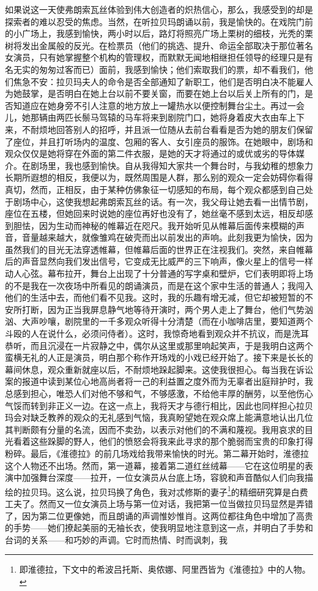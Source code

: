 \par 如果说这一天使弗朗索瓦丝体验到伟大创造者的炽热信心，那么，我感受到的却是探索者的难以忍受的焦虑。当然，在听拉贝玛朗诵以前，我是愉快的。在戏院门前的小广场上，我感到愉快，两小时以后，路灯将照亮广场上栗树的细枝，光秃的栗树将发出金属般的反光。在检票员（他们的挑选、提升、命运全部取决于那位著名女演员，只有她掌握整个机构的管理权，而默默无闻地相继担任领导的经理只是有名无实的匆匆过客而已）面前，我感到愉快；他们索取我们的票，却不看我们，他们焦急不安：拉贝玛夫人的命令是否全部通知了新职工，他们是否明白决不能雇人为她鼓掌，是否明白在她上台以前不要关窗，而要在她上台以后关上所有的门，是否知道应在她身旁不引人注意的地方放上一罐热水以便控制舞台尘土。再过一会儿，她那辆由两匹长鬃马驾辕的马车将来到剧院门口，她将身着皮大衣由车上下来，不耐烦地回答别人的招呼，并且派一位随从去前台看看是否为她的朋友们保留了座位，并且打听场内的温度、包厢的客人、女引座员的服饰。在她眼中，剧场和观众仅仅是她将穿在外面的第二件衣服，是她的天才将通过的或优或劣的导体媒介。在剧场里，我也感到愉快。自从我得知大家共一个舞台时，与我幼稚的想象力长期所遐想的相反，我便以为，既然周围是人群，那么别的观众一定会妨碍你看得真切，然而，正相反，由于某种仿佛象征一切感知的布局，每个观众都感到自己处于剧场中心，这使我想起弗朗索瓦丝的话。有一次，我父母让她去看一出情节剧，座位在五楼，但她回来时说她的座位再好也没有了，她丝毫不感到太远，相反却感到胆怯，因为生动而神秘的帷幕近在咫尺。我开始听见从帷幕后面传来模糊的声音，音量越来越大，就像雏鸡在破壳而出以前发出的声响。此刻我更为愉快，因为虽然我们的目光无法穿透帷幕，但帷幕后面的世界正在注视我们。突然，来自帷幕后的声音显然向我们发出信号，它变成无比威严的三下响声，像火星上的信号一样动人心弦。幕布拉开，舞台上出现了十分普通的写字桌和壁炉，它们表明即将上场的不是我在一次夜场中所看见的朗诵演员，而是在这个家中生活的普通人；我闯入他们的生活中去，而他们看不见我。这时，我的乐趣有增无减，但它却被短暂的不安所打断，因为正当我屏息静气地等待开演时，两个男人走上了舞台，他们气势汹汹、大声吵嚷，剧院里的一千多观众听得十分清楚（而在小咖啡店里，要知道两个斗殴的人在说什么，必须问侍者）。这时，我惊奇地看到观众并不抗议，而是洗耳恭听，而且沉浸在一片寂静之中，偶尔从这里或那里响起笑声，于是我明白这两个蛮横无礼的人正是演员，明白那个称作开场戏的小戏已经开始了。接下来是长长的幕间休息，观众重新就座以后，不耐烦地跺起脚来。这使我很担心。每当我在诉讼案的报道中读到某位心地高尚者将一己的利益置之度外而为无辜者出庭辩护时，我总感到担心，唯恐人们对他不够和气，不够感激，不给他丰厚的酬劳，以至他伤心气馁而转到非正义一边。在这一点上，我将天才与德行相比，因此也同样担心拉贝玛会对缺乏教养的观众的无礼感到气恼，我真盼望她在观众席上能满意地认出几位其判断颇有分量的名流，因而不卖劲，以表示对他们的不满和蔑视。我用哀求的目光看着这些跺脚的野人，他们的愤怒会将我来此寻求的那个脆弱而宝贵的印象打得粉碎。最后，《淮德拉》的前几场戏给我带来愉快的时光。第二幕开始时，淮德拉这个人物还不出场。然而，第一道幕，接着第二道红丝绒幕——它在这位明星的表演中加强舞台深度——拉开，一位女演员从台底上场，容貌和声音酷似人们向我描绘的拉贝玛。这么说，拉贝玛换了角色，我对忒修斯的妻子\footnote{即淮德拉，下文中的希波吕托斯、奥侬娜、阿里西皆为《淮德拉》中的人物。}的精细研究算是白费工夫了。然而又一位女演员上场与第一位对话，我把第一位当做拉贝玛显然是弄错了，因为第二位更像她，而且朗诵的声调惟妙惟肖。这两位都往角色中增加了高贵的手势——她们撩起美丽的无袖长衣，使我明显地注意到这一点，并明白了手势和台词的关系——和巧妙的声调。它时而热情、时而讽刺，我